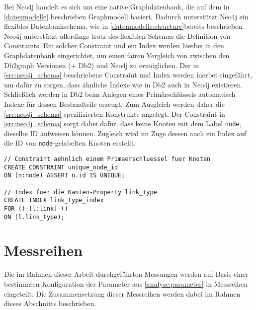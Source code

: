 Bei Neo4j handelt es sich um eine native Graphdatenbank, die auf dem in \autoref{datenmodelle} beschrieben Graphmodell basiert. Dadurch unterstützt Neo4j ein flexibles Datenbankschema, wie in \autoref{datenmodelle:structure}bereits beschrieben. Neo4j unterstützt allerdings trotz des flexiblen Schemas die Definition von Constraints. Ein solcher Constraint und ein Index werden hierbei in den Graphdatenbank eingerichtet, um einen fairen Vergleich von zwischen den Db2graph Versionen (+ Db2) und Neo4j zu ermöglichen. Der in \autoref{src:neo4j_schema} beschriebene Constraint und Index werden hierbei eingeführt, um dafür zu sorgen, dass ähnliche Indexe wie in Db2 auch in Neo4j existieren. Schließlich werden in Db2 beim Anlegen eines Primärschlüssels automatisch Indexe für dessen Bestandteile erzeugt. Zum Ausgleich werden daher die \autoref{src:neo4j_schema} spezifizierten Konstrukte angelegt. Der Constraint in \autoref{src:neo4j_schema} sorgt dabei dafür, dass keine Knoten mit dem Label \texttt{node}, dieselbe ID aufweisen können. Zugleich wird im Zuge dessen auch ein Index auf die ID von \texttt{node}-gelabelten Knoten erstellt.

\begin{lstlisting}[label=src:neo4j_schema,caption={Neo4j Instanz Datenbankschema},language=CQL]
// Constraint aehnlich einem Primaerschluessel fuer Knoten
CREATE CONSTRAINT unique_node_id 
ON (n:node) ASSERT n.id IS UNIQUE;

// Index fuer die Kanten-Property link_type
CREATE INDEX link_type_index 
FOR ()-[l:link]-() 
ON (l.link_type);
\end{lstlisting}

\section{Messreihen}
\label{analyse:messreihen}
Die im Rahmen dieser Arbeit durchgeführten Messungen werden auf Basis einer bestimmten Konfiguration der Parameter aus \autoref{analyse:parameter} in Messreihen eingeteilt. Die Zusammensetzung dieser Messreihen werden dabei im Rahmen dieses Abschnitts beschrieben. 

